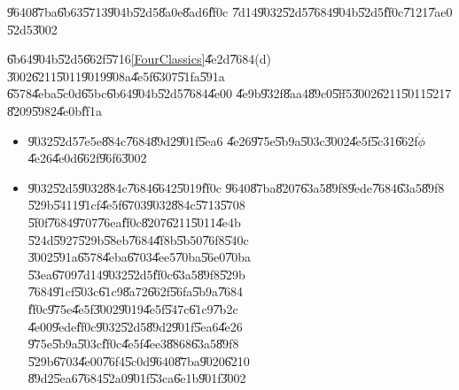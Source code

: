 \begin{case}
\U{9640}\U{87ba}\U{6b63}\U{5713}\U{904b}\U{52d5}\U{8a0e}\U{8ad6}\U{ff0c}%
\U{7d14}\U{9032}\U{52d5}\U{7684}\U{904b}\U{52d5}\U{ff0c}\U{7121}\U{7ae0}%
\U{52d5}\U{3002}
\end{case}

\U{6b64}\U{904b}\U{52d5}\U{662f}\U{5716}\ref{FourClassics}\U{4e2d}\U{7684}(d)%
\U{3002}\U{6211}\U{5011}\U{9019}\U{908a}\U{4e5f}\U{6307}\U{51fa}\U{591a}%
\U{6578}\U{4eba}\U{5c0d}\U{65bc}\U{6b64}\U{904b}\U{52d5}\U{7684}\U{4e00}%
\U{4e9b}\U{932f}\U{8aa4}\U{89c0}\U{5ff5}\U{3002}\U{6211}\U{5011}\U{5217}%
\U{8209}\U{5982}\U{4e0b}\U{ff1a}

\begin{itemize}
\item \U{9032}\U{52d5}\U{7e5e}\U{884c}\U{7684}\U{89d2}\U{901f}\U{5ea6}%
\U{4e26}\U{975e}\U{5b9a}\U{503c}\U{3002}\U{4e5f}\U{5c31}\U{662f}$\dot{\phi}$%
\U{4e26}\U{4e0d}\U{662f}\U{96f6}\U{3002}

\item \U{9032}\U{52d5}\U{9032}\U{884c}\U{7684}\U{6642}\U{5019}\U{ff0c}%
\U{9640}\U{87ba}\U{8207}\U{63a5}\U{89f8}\U{9ede}\U{7684}\U{63a5}\U{89f8}%
\U{529b}\U{5411}\U{91cf}\U{4e5f}\U{6703}\U{9032}\U{884c}\U{5713}\U{5708}%
\U{5f0f}\U{7684}\U{9707}\U{76ea}\U{ff0c}\U{8207}\U{6211}\U{5011}\U{4e4b}%
\U{524d}\U{5927}\U{529b}\U{58eb}\U{7684}\U{4f8b}\U{5b50}\U{76f8}\U{540c}%
\U{3002}\U{591a}\U{6578}\U{4eba}\U{6703}\U{4ee5}\U{70ba}\U{56e0}\U{70ba}%
\U{53ea}\U{6709}\U{7d14}\U{9032}\U{52d5}\U{ff0c}\U{63a5}\U{89f8}\U{529b}%
\U{7684}\U{91cf}\U{503c}\U{61c9}\U{8a72}\U{662f}\U{56fa}\U{5b9a}\U{7684}%
\U{ff0c}\U{975e}\U{4e5f}\U{3002}\U{9019}\U{4e5f}\U{547c}\U{61c9}\U{7b2c}%
\U{4e00}\U{9ede}\U{ff0c}\U{9032}\U{52d5}\U{89d2}\U{901f}\U{5ea6}\U{4e26}%
\U{975e}\U{5b9a}\U{503c}\U{ff0c}\U{4e5f}\U{4ee3}\U{8868}\U{63a5}\U{89f8}%
\U{529b}\U{6703}\U{4e00}\U{76f4}\U{5c0d}\U{9640}\U{87ba}\U{9020}\U{6210}%
\U{89d2}\U{5ea6}\U{7684}\U{52a0}\U{901f}\U{53ca}\U{6e1b}\U{901f}\U{3002}
\end{itemize}

